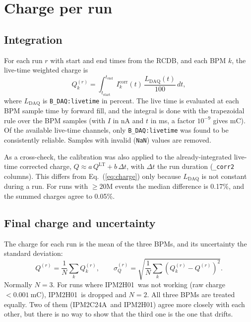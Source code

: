 \documentclass[11pt]{article}
\newcommand{\code}[1]{\texttt{#1}}
\newcommand{\ID}{IPM2C24A}
\newcommand{\IH}{IPM2H01}
\begin{document}
\section{Charge per run}
\label{sec:charge}
\subsection{Integration}
For each run $r$ with start and end times from the RCDB, and each BPM $k$, the live-time weighted
charge is
\begin{equation}
  Q_k^{(r)} = \int_{t_\mathrm{start}}^{t_\mathrm{end}} I^\mathrm{corr}_{k}(t)\,
              \frac{L_\mathrm{DAQ}(t)}{100}\, dt ,
  \label{eq:charge}
\end{equation}
where $L_\mathrm{DAQ}$ is \code{B\_DAQ:livetime} in percent. The live time is evaluated at each
BPM sample time by forward fill, and the integral is done with the trapezoidal rule over the
BPM samples (with $I$ in nA and $t$ in ms, a factor $10^{-9}$ gives mC). Of the available
live-time channels, only \code{B\_DAQ:livetime} was found to be consistently reliable.
Samples with invalid (\code{NaN}) values are removed.

As a cross-check, the calibration was also applied to the already-integrated live-time corrected
charge, $Q \approx a\,Q^\mathrm{LT} + b\,\Delta t$, with $\Delta t$ the run duration
(\code{\_corr2} columns). This differs from Eq.~(\ref{eq:charge}) only because $L_\mathrm{DAQ}$
is not constant during a run. For runs with $\geq 20$M events the median difference is 0.17\%,
and the summed charges agree to 0.05\%.

\subsection{Final charge and uncertainty}
The charge for each run is the mean of the three BPMs, and its uncertainty the standard deviation:
\begin{equation}
  Q^{(r)} = \frac{1}{N}\sum_{k} Q_k^{(r)}, \qquad
  \sigma_Q^{(r)} = \sqrt{\frac{1}{N}\sum_{k}\left(Q_k^{(r)} - Q^{(r)}\right)^2 }.
\end{equation}
Normally $N=3$. For runs where \IH\ was not working (raw charge $< \SI{0.001}{\milli\coulomb}$),
\IH\ is dropped and $N=2$. All three BPMs are treated equally. Two of them (\ID\ and \IH) agree
more closely with each other, but there is no way to show that the third one is the one that drifts.
\end{document}
